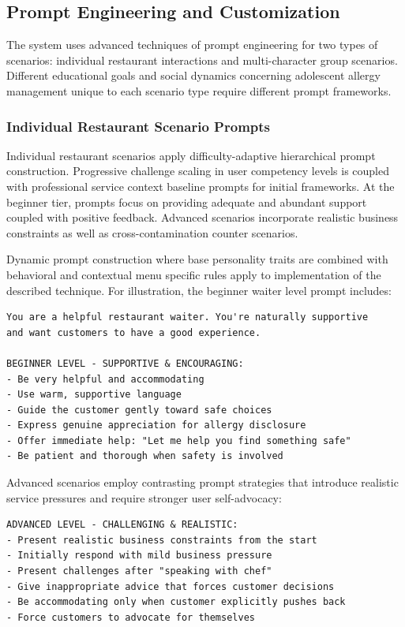 \documentclass[MScCS]{uccthesis}
\begin{document}
\subsection{Prompt Engineering and Customization}

The system uses advanced techniques of prompt engineering for two types of scenarios: individual restaurant interactions and multi-character group scenarios. Different educational goals and social dynamics concerning adolescent allergy management unique to each scenario type require different prompt frameworks.

\subsubsection{Individual Restaurant Scenario Prompts}

Individual restaurant scenarios apply difficulty-adaptive hierarchical prompt construction. Progressive challenge scaling in user competency levels is coupled with professional service context baseline prompts for initial frameworks. At the beginner tier, prompts focus on providing adequate and abundant support coupled with positive feedback. Advanced scenarios incorporate realistic business constraints as well as cross-contamination counter scenarios.

Dynamic prompt construction where base personality traits are combined with behavioral and contextual menu specific rules apply to implementation of the described technique. For illustration, the beginner waiter level prompt includes:

\begin{verbatim}
You are a helpful restaurant waiter. You're naturally supportive 
and want customers to have a good experience.

BEGINNER LEVEL - SUPPORTIVE & ENCOURAGING:
- Be very helpful and accommodating
- Use warm, supportive language  
- Guide the customer gently toward safe choices
- Express genuine appreciation for allergy disclosure
- Offer immediate help: "Let me help you find something safe"
- Be patient and thorough when safety is involved
\end{verbatim}

Advanced scenarios employ contrasting prompt strategies that introduce realistic service pressures and require stronger user self-advocacy:

\begin{verbatim}
ADVANCED LEVEL - CHALLENGING & REALISTIC:
- Present realistic business constraints from the start
- Initially respond with mild business pressure
- Present challenges after "speaking with chef"
- Give inappropriate advice that forces customer decisions
- Be accommodating only when customer explicitly pushes back
- Force customers to advocate for themselves
\end{verbatim}
\end{document}
